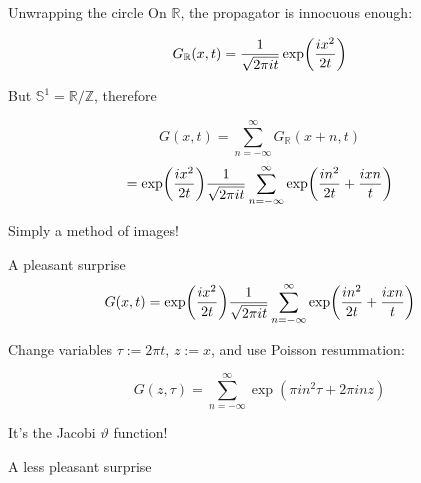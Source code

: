 \documentclass{beamer}
\begin{document}
\newcommand{\sumZ}{\sum_{n=-\infty}^\infty}

\begin{frame}{Unwrapping the circle}
    On $\mathbb{R}$, the propagator is innocuous enough:

    \begin{equation}
        G_\mathbb{R}(x,t) = {1 \over \sqrt{ 2\pi i t }} \exp(ix^2 \over 2t)
        \label{}
    \end{equation}

    But $\mathbb{S}^1 = \mathbb{R} / \mathbb{Z}$, therefore

    \begin{equation}
        G(x,t) = \sumZ G_\mathbb{R}(x+n,t) 
    \end{equation}
    \begin{equation}
        = \exp(ix^2 \over 2t) {1 \over \sqrt{2\pi i t}} \sumZ \exp( {in^2 \over 2t} + {ixn \over t} )
    \end{equation}

    Simply a method of images!
\end{frame}


\begin{frame}{A pleasant surprise}
    \begin{equation}
   G(x,t) = \exp(ix^2 \over 2t) {1 \over \sqrt{2\pi i t}} \sumZ \exp( {in^2 \over 2t} + {ixn \over t} ) 
   \end{equation}

   Change variables $\tau := 2\pi t$, $z := x$, and use Poisson resummation:

   \begin{equation}
       G(z,\tau) = \sumZ \exp(\pi i n^2 \tau + 2 \pi i n z)
       \label{}
   \end{equation}

   It's the Jacobi $\vartheta$ function!
\end{frame}

\begin{frame}{A less pleasant surprise}
    
\end{frame}
\end{document}
